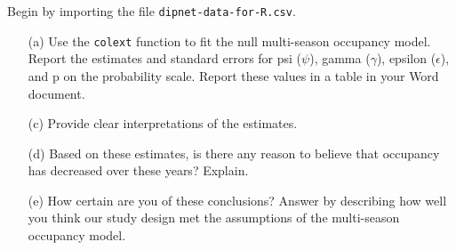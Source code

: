 \documentclass[12pt]{article}\usepackage[]{graphicx}\usepackage[]{xcolor}
\begin{document}
Begin by importing the file \texttt{dipnet-data-for-R.csv}.

\begin{enumerate}
  \item[(a)] Use the \texttt{colext} function to fit the null
    multi-season occupancy model. Report the estimates and standard
    errors for psi ($\psi$), gamma ($\gamma$), epsilon ($\epsilon$),
    and p on the probability scale. Report these values in a table in
    your Word document.   
  \item[(c)] Provide clear interpretations of the estimates. 
  \item[(d)] Based on these estimates, is there any reason to believe
    that occupancy has decreased over these years? Explain. 
  \item[(e)] How certain are you of these conclusions? Answer by
    describing how well you think our study design met the assumptions
    of the multi-season occupancy model. 
\end{enumerate}
\end{document}

